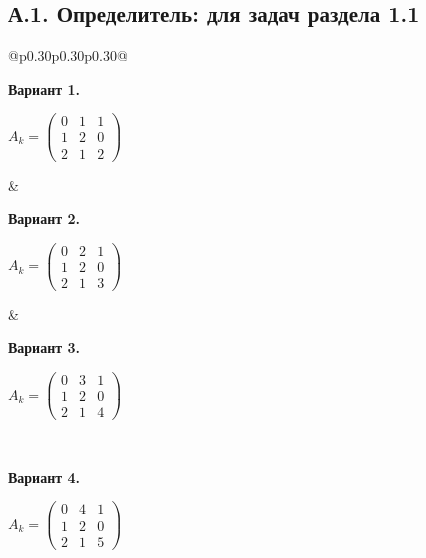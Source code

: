 \documentclass[12pt,a4paper]{article}
\begin{document}
\subsection*{А.1. Определитель: для задач раздела 1.1}
{\small
\begin{longtable}{@{}p{0.30\textwidth}p{0.30\textwidth}p{0.30\textwidth}@{}}
\begin{minipage}[t]{\linewidth}\vspace{0pt}\raggedright\setlength{\parskip}{0pt}
\textbf{Вариант 1.}\par\smallskip
\(\displaystyle A_k=\begin{pmatrix}0&1&1\\1&2&0\\2&1&2\end{pmatrix}\)\par
\end{minipage} &
\begin{minipage}[t]{\linewidth}\vspace{0pt}\raggedright\setlength{\parskip}{0pt}
\textbf{Вариант 2.}\par\smallskip
\(\displaystyle A_k=\begin{pmatrix}0&2&1\\1&2&0\\2&1&3\end{pmatrix}\)\par
\end{minipage} &
\begin{minipage}[t]{\linewidth}\vspace{0pt}\raggedright\setlength{\parskip}{0pt}
\textbf{Вариант 3.}\par\smallskip
\(\displaystyle A_k=\begin{pmatrix}0&3&1\\1&2&0\\2&1&4\end{pmatrix}\)\par
\end{minipage}\\\noalign{\vskip 14pt}
\begin{minipage}[t]{\linewidth}\vspace{0pt}\raggedright\setlength{\parskip}{0pt}
\textbf{Вариант 4.}\par\smallskip
\(\displaystyle A_k=\begin{pmatrix}0&4&1\\1&2&0\\2&1&5\end{pmatrix}\)\par

\end{minipage}
\end{longtable}}
\end{document}
